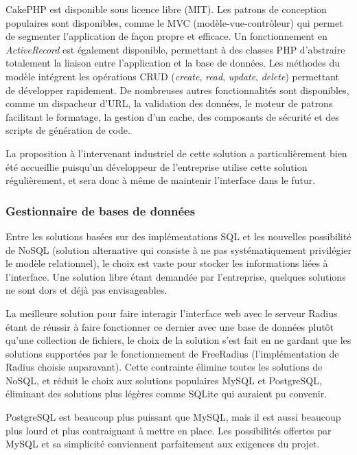 CakePHP est disponible sous licence libre (MIT). Les patrons de conception populaires sont disponibles, comme le MVC (modèle-vue-contrôleur) qui permet de segmenter l'application de façon propre et efficace. Un fonctionnement en \textit{ActiveRecord} est également disponible, permettant à des classes PHP d'abstraire totalement la liaison entre l'application et la base de données. Les méthodes du modèle intégrent les opérations CRUD (\textit{create}, \textit{read}, \textit{update}, \textit{delete}) permettant de développer rapidement. De nombreuses autres fonctionnalités sont disponibles, comme un dispacheur d'URL, la validation des données, le moteur de patrons facilitant le formatage, la gestion d'un cache, des composants de sécurité et des scripts de génération de code.

La proposition à l'intervenant industriel de cette solution a particulièrement bien été accueillie puisqu'un développeur de l'entreprise utilise cette solution régulièrement, et sera donc à même de maintenir l'interface dans le futur.

\subsubsection{Gestionnaire de bases de données}

Entre les solutions basées sur des implémentations SQL et les nouvelles possibilité de NoSQL (solution alternative qui consiste à ne pas systématiquement privilégier le modèle relationnel), le choix est vaste pour stocker les informations liées à l'interface. Une solution libre étant demandée par l'entreprise, quelques solutions ne sont dors et déjà pas envisageables. 

La meilleure solution pour faire interagir l'interface web avec le serveur Radius étant de réussir à faire fonctionner ce dernier avec une base de données plutôt qu'une collection de fichiers, le choix de la solution s'est fait en ne gardant que les solutions supportées par le fonctionnement de FreeRadius (l'implémentation de Radius choisie auparavant). Cette contrainte élimine toutes les solutions de NoSQL, et réduit le choix aux solutions populaires MySQL et PostgreSQL, éliminant des solutions plus légères comme SQLite qui auraient pu convenir.

PostgreSQL est beaucoup plus puissant que MySQL, mais il est aussi beaucoup plus lourd et plus contraignant à mettre en place. Les possibilités offertes par MySQL et sa simplicité conviennent parfaitement aux exigences du projet.

